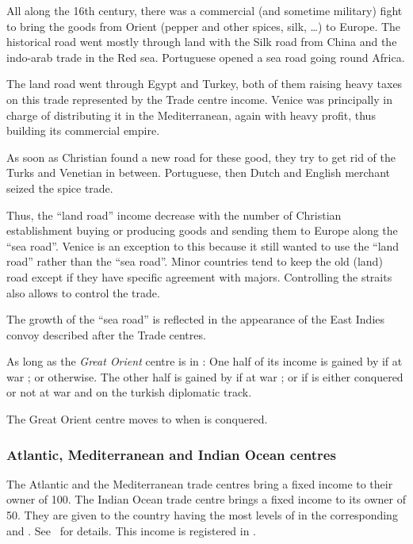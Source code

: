 \begin{histoire}
  All along the 16th century, there was a commercial (and sometime
  military) fight to bring the goods from Orient (pepper and other
  spices, silk, \ldots) to Europe. The historical road went mostly
  through land with the Silk road from China and the indo-arab trade in
  the Red sea. Portuguese opened a sea road going round Africa.

  The land road went through Egypt and Turkey, both of them raising
  heavy taxes on this trade represented by the Trade centre
  income. Venice was principally in charge of distributing it in the
  Mediterranean, again with heavy profit, thus building its commercial
  empire.

  As soon as Christian found a new road for these good, they try to get
  rid of the Turks and Venetian in between. Portuguese, then Dutch and
  English merchant seized the spice trade.

  Thus, the ``land road'' income decrease with the number of Christian
  establishment buying or producing goods and sending them to Europe
  along the ``sea road''. Venice is an exception to this because it
  still wanted to use the ``land road'' rather than the ``sea
  road''. Minor countries tend to keep the old (land) road except if
  they have specific agreement with majors. Controlling the straits also
  allows to control the trade.

  The growth of the ``sea road'' is reflected in the appearance of the
  East Indies convoy described after the Trade centres.
\end{histoire}

\aparag As long as the \emph{Great Orient} centre is in :
\bparag One half of its income is gained by \paysEgypte if at war ; or \VEN
otherwise.
\bparag The other half is gained by \paysDamas if at war ; or \TUR if
\paysDamas is either conquered or not at war and on the turkish
diplomatic track.

\aparag The Great Orient centre moves to \TUR when \paysEgypte is
conquered.

\subsubsection{Atlantic, Mediterranean and Indian Ocean centres}\label{chIncomes:Trade Centres}
\aparag The Atlantic and the Mediterranean trade centres bring a fixed
income to their owner of 100\ducats.
\bparag The Indian Ocean trade centre brings a fixed income to its owner
of 50\ducats.
\bparag They are given to the country having the most levels of
\TradeFLEET in the corresponding \STZ and \CTZ.
See~ for details.
\bparag This income is registered in .

